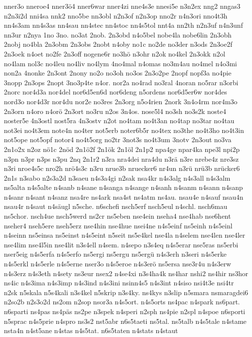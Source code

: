 {nner3o
nneroe4
nner3ö4
nner6war
nner4zi
nne4s3e
nnesi5e
n3n2ex
nng2
nngas3
n2n3i2d
nni4sa
nnk2
nno5be
nn3obl
n2n3of
n2n3op
nno2r
n4n3ori
nno4t3h
nn4s3am
nn4s3as
nn4sau
nn4stec
nn4stoc
nn4s5tol
nnt4a
nn2th
n2n3uf
n4n3unf
nn3ur
n2nya
1no
3no.
no3at
2nob.
2n3obd
n4o5bel
nobe4la
nobe6lin
2n3obh
2nobj
no4bla
2n3obm
2n3obs
2nobt
n4oby
no1c
no2de
no3der
n3ods
2n3oe2f
2n3oek
n4oet
no2fe
2n3off
nogene6r
no3hö
n3ohr
n2ok
no4kel
2n3okk
n2ol
no4lam
nol3c
no4leu
no4liv
no4lym
4no4mal
n4omas
no3m4au
no4mel
n4o3mi
non2a
4nonke
2n3ont
2nony
no2o
no3oh
no3os
2n3o2pe
2nopf
nopf3a
no4pie
3nopp
2n3ops
2nopt
3no3p4te
n4or.
nor2a
no4rad
no3ral
4noran
no5rar
n3orbi
2norc
nor4d3a
nor4del
nor6d5en6d
nor6deng
n5ordens
nor6d5er6w
nor4des
nord3o
nor4d3r
nor4du
nor2e
no3res
2n3org
n5o4rien
2nork
3n4o4rm
nor4m3o
2n3orn
n4oro
n4orö
2n3ort
no3ru
n2os
3n4os.
nose5l4
no3sh
no3s2k
noste4
noster5e
4n3ostl
nost5ra
4n3ostv
n2ot
no4tam
no4t3an
no4tap
no3tar
no4tau
not3ei
no4t3em
note4n
no4ter
not5erb
noter6b5r
no4tex
no3the
no4t3ho
no4t3in
not5ope
not5opf
notor4
no4t5org
no2tr
3not3s
no4t3um
3notv
2n3out
no3va
2n1o2x
n2oz
nö1c
2nöd
2n1ö2f
2n1ök
2n1öl
2n1p2
npa4ge
npar4ka
npe3l
npi2p
n3pn
n3pr
n3ps
n3pu
2nq
2n1r2
n3ra
nra4dei
nra4du
n3rä
n3re
nrebe4z
nre3sz
n3ri
nroe4s5c
nro2h
nrö4s3c
n3ru
nrue3b
nruecker6
nr4un
n3rü
nrü3b
nrücker6
2n1s
n3sabo
n2s3a2d
n3saeu
n4s3a4gi
n2sak
nsa4kr
n4s3alg
n4s3all
n4s3alm
ns5alta
n4s5alte
n4sanb
n4sane
n4sanga
n4sange
n4sanh
n4sanm
n4sann
n4sanp
n4sanr
n4sant
n4sanz
nsa4re
ns4ark
nsa4st
ns4atm
ns4au.
nsau4e
n4sauf
nsau4n
nsau4r
n4saut
n4säugl
n5sche.
n6schefi
nsch5erf
nsch5eul
n4schl.
nsch6mau
ns5chor.
nsch4ue
nsch5werd
ns2cr
ns5eben
nse4ein
nseha4
nse4hab
nse6hent
nseher4
nseh5ere
nseh5erz
nse4hin
nse4hue
nsei4ne
n4s5einf
ns5einh
n4s5einl
n4seinn
ns5einsa
ns5einst
n4s5eint
n5seit
ns5e4kel
nse4la
n4selem
nse4len
nse4ler
nse4lim
nse4l5in
nse4lit
n3s4ell
n4sem.
n4sepo
n3s4eq
n4s5erar
nse5ras
ns5erbi
nser5eig
n4s5erfa
n4s5erfo
ns5ergi
ns5ergu
ns5ergü
n4s3erh
n3seri
n4s5erke
n4s5erkl
n4s5erle
n4s5erne
nser3o
n4s5eroe
n4s3erö
ns5ersa
nse3r4u
n4s3erw
n4s3erz
n4s3eth
n4sety
ns3eur
nsex2
n4se4xi
n3s4ha4k
ns4har
nshi2
ns4hir
ns3hor
ns4ic
n4s3ima
n4s3imp
n4s3ind
n4s3ini
nsinn4s5
n4s3int
n4siso
nsi4t3e
nsi4tr
n2sk
n5skala
n5s4kali
n3s4kel
n5skrip
n3s4ky.
ns4kys
n3slip
n5smara
nsmaragdei6
n2so2b
n2s3o2d
ns2om
n2sop
nsor3a
n4s5ort.
n4s5orts
ns4pac
n4spark
ns6part.
n6sparti
ns4pas
ns4päs
ns2pe
n3spek
n4speri
n2sph
ns4pie
n2spl
n4spoe
n6sporti
n5sprac
n4s5prie
n4spro
ns3s2
nst5abr
n6s5taeti
ns5tal.
ns5talb
n4s5tale
n4stame
nsta4n
n4st5ane
n4stas
n4s5tat.
n6s5taten
n4stats
n4staut
}
